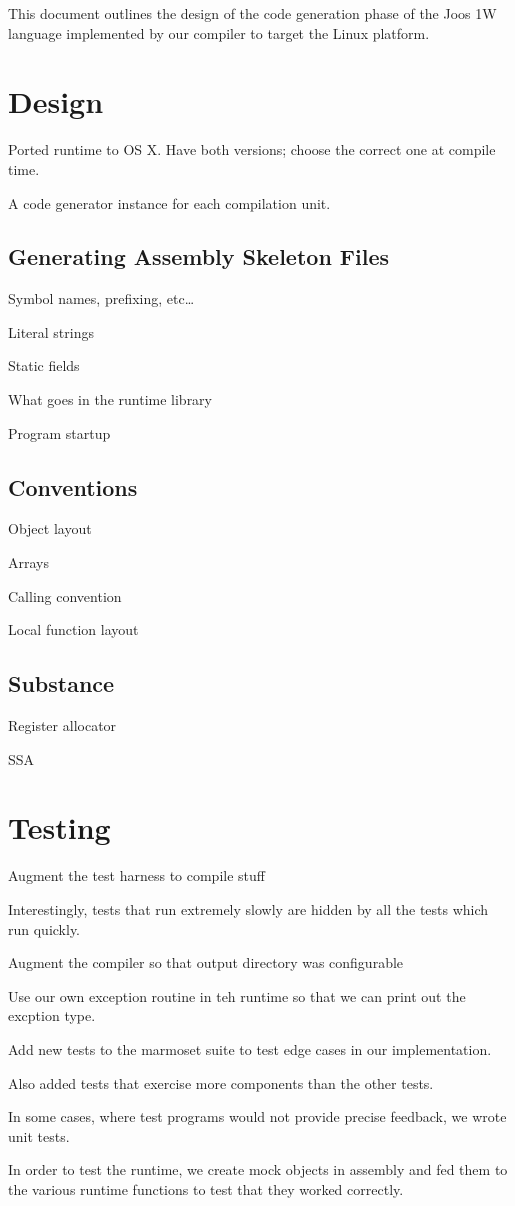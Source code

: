 \documentclass[pdftex,11pt,a4paper]{article}
\begin{document}

This document outlines the design of the code generation phase of
the Joos 1W language implemented by our compiler to target the
 Linux platform.


\section{Design}

Ported runtime to OS X. Have both versions; choose the correct one at
compile time.

A code generator instance for each compilation unit.


\subsection{Generating Assembly Skeleton Files}

Symbol names, prefixing, etc\ldots

Literal strings

Static fields

What goes in the runtime library

Program startup


\subsection{Conventions}

Object layout

Arrays

Calling convention

Local function layout


\subsection{Substance}

Register allocator

SSA


\section{Testing}

Augment the test harness to compile stuff

Interestingly, tests that run extremely slowly are hidden by all the
tests which run quickly.

Augment the compiler so that output directory was configurable

Use our own exception routine in teh runtime so that we can print out
the excption type.

Add new tests to the marmoset suite to test edge cases in our
implementation.

Also added tests that exercise more components than the other tests.

In some cases, where test programs would not provide precise feedback,
we wrote unit tests.

In order to test the runtime, we create mock objects in assembly and
fed them to the various runtime functions to test that they worked
correctly.
\end{document}
